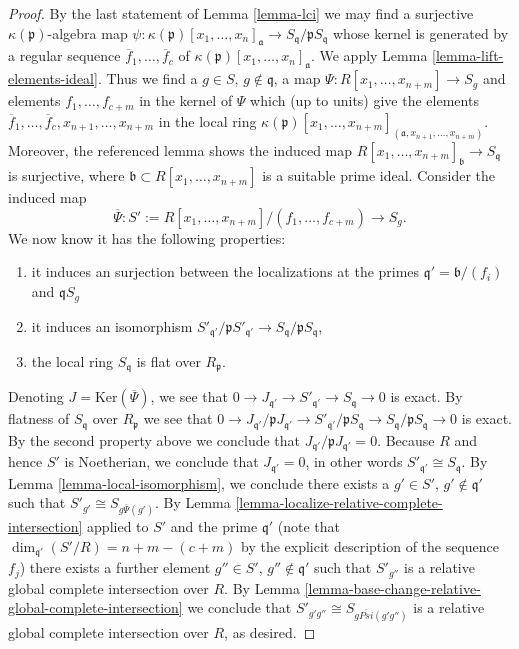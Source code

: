 \begin{proof}
\medskip\noindent
By the last statement of Lemma \ref{lemma-lci}
we may find a surjective $\kappa(\mathfrak p)$-algebra map
$\psi : \kappa(\mathfrak p)[x_1, \ldots, x_n]_{\mathfrak a}
\to S_{\mathfrak q}/\mathfrak pS_{\mathfrak q}$ whose
kernel is generated by a regular sequence
$\overline{f}_1, \ldots, \overline{f}_c$ of
$\kappa(\mathfrak p)[x_1, \ldots, x_n]_{\mathfrak a}$.
We apply Lemma \ref{lemma-lift-elements-ideal}.
Thus we find a $g \in S$, $g \not \in \mathfrak q$,
a map $\Psi : R[x_1, \ldots, x_{n + m}] \to S_g$ 
and elements $f_1, \ldots, f_{c + m}$ in the kernel
of $\Psi$ which (up to units) give the elements
$\overline{f}_1, \ldots, \overline{f}_c, x_{n + 1}, \ldots, x_{n + m}$
in the local ring
$\kappa(\mathfrak p)[x_1, \ldots, x_{n + m}]_{
(\mathfrak a, x_{n + 1}, \ldots, x_{n + m})}$.
Moreover, the referenced lemma shows the induced map
$R[x_1, \ldots, x_{n + m}]_{\mathfrak b} \to S_{\mathfrak q}$
is surjective, where $\mathfrak b \subset R[x_1, \ldots, x_{n + m}]$
is a suitable prime ideal. Consider the induced map
$$
\overline{\Psi} :
S' := R[x_1, \ldots, x_{n + m}]/(f_1, \ldots, f_{c + m})
\longrightarrow
S_g.
$$
We now know it has the following properties:
\begin{enumerate}
\item it induces an surjection between the localizations
at the primes $\mathfrak q' = \mathfrak b/(f_i)$ and $\mathfrak qS_g$
\item it induces an isomorphism
$S'_{\mathfrak q'}/\mathfrak pS'_{\mathfrak q'} \to
S_{\mathfrak q}/\mathfrak p S_{\mathfrak q}$,
\item the local ring $S_{\mathfrak q}$ is flat over $R_{\mathfrak p}$.
\end{enumerate}
Denoting $J = \text{Ker}(\overline{\Psi})$, we see that
$0 \to J_{\mathfrak q'} \to S'_{\mathfrak q'} \to S_{\mathfrak q} \to 0$
is exact. By flatness of $S_{\mathfrak q}$ over $R_{\mathfrak p}$
we see that 
$0 \to
J_{\mathfrak q'}/\mathfrak pJ_{\mathfrak q'} \to
S'_{\mathfrak q'}/\mathfrak p S_{\mathfrak q}\to
S_{\mathfrak q}/\mathfrak pS_{\mathfrak q} \to 0$
is exact. By the second property above we conclude that
$J_{\mathfrak q'}/\mathfrak pJ_{\mathfrak q'} = 0$.
Because $R$ and hence $S'$ is Noetherian, we conclude
that $J_{\mathfrak q'} = 0$, in other words
$S'_{\mathfrak q'} \cong S_{\mathfrak q}$.
By Lemma \ref{lemma-local-isomorphism}, we conclude there exists
a $g' \in S'$, $g' \not \in \mathfrak q'$
such that $S'_{g'} \cong S_{g\overline{\Psi}(g')}$.
By Lemma \ref{lemma-localize-relative-complete-intersection}
applied to $S'$ and the prime $\mathfrak q'$ (note that
$\dim_{\mathfrak q'}(S'/R) = n + m - (c + m)$ by the 
explicit description of the sequence $f_j$) there exists
a further element $g'' \in S'$, $g'' \not \in \mathfrak q'$
such that $S'_{g''}$ is a relative global complete intersection
over $R$. By
Lemma \ref{lemma-base-change-relative-global-complete-intersection}
we conclude that $S'_{g'g''} \cong S_{g\overline{Psi}(g'g'')}$
is a relative global complete intersection over $R$, as desired.
\end{proof}

